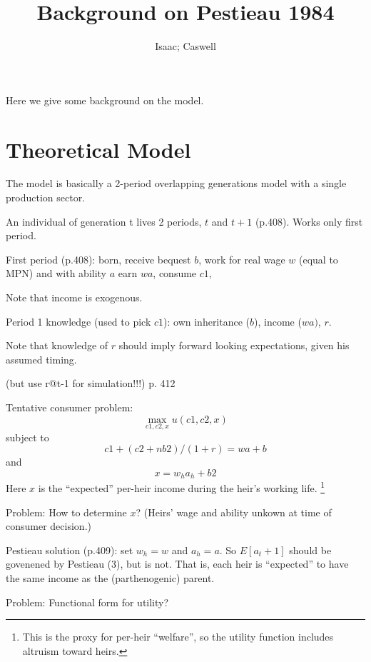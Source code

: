 \documentclass{article}
\begin{document}
\author{Isaac; Caswell}
\title{Background on Pestieau 1984}
\maketitle

Here we give some background on the \citet{pestieau-1984-oep} model.


\section{Theoretical Model}

The model is basically a 2-period overlapping generations model with a single production sector.

An individual of generation t lives 2 periods, $t$ and $t+1$ (p.408).
Works only first period.

First period (p.408):
born,
receive bequest $b$,
work for real wage $w$ (equal to MPN) and with ability $a$ earn $wa$,
consume $c1$,

Note that income is exogenous.

Period 1 knowledge (used to pick $c1$):
own inheritance ($b$),
income ($wa)$, $r$.

Note that knowledge of $r$ should imply forward looking expectations,
given his assumed timing.

(but use r@t-1 for simulation!!!) p. 412

Tentative consumer problem:
\begin{equation}
\max_{c1,c2,x} u(c1, c2, x)
\end{equation}
subject to
\begin{equation}
c1 + (c2 + n b2)/(1+r) = w a + b
\end{equation}
and
\begin{equation}
x = w_{h}a_{h}+ b2
\end{equation}
Here $x$ is the ``expected'' per-heir income during the heir's working life.%
\footnote{%
This is the proxy for per-heir ``welfare'',
so the utility function includes altruism toward heirs.
} %
%


Problem: How to determine $x$?
(Heirs' wage and ability unkown at time of consumer decision.)

Pestieau solution (p.409): set $w_{h}=w$ and $a_{h}=a$.
So $E[a_t+1]$ should be govenened by Pestieau (3), but is not.
That is, each heir is ``expected'' to have the same income as the (parthenogenic) parent.

Problem: Functional form for utility?
\end{document}
